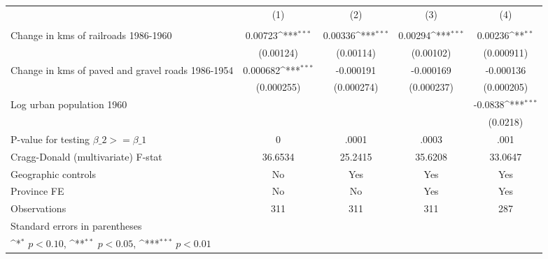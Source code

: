 {
\def\sym#1{\ifmmode^{#1}\else\(^{#1}\)\fi}
\begin{tabular}{l*{4}{c}}
\hline\hline
                &\multicolumn{1}{c}{(1)}&\multicolumn{1}{c}{(2)}&\multicolumn{1}{c}{(3)}&\multicolumn{1}{c}{(4)}\\
                &\multicolumn{1}{c}{}&\multicolumn{1}{c}{}&\multicolumn{1}{c}{}&\multicolumn{1}{c}{}\\
\hline
Change in kms of railroads 1986-1960&  0.00723\sym{***}&  0.00336\sym{***}&  0.00294\sym{***}&  0.00236\sym{**} \\
                &(0.00124)         &(0.00114)         &(0.00102)         &(0.000911)         \\
[1em]
Change in kms of paved and gravel roads 1986-1954& 0.000682\sym{***}&-0.000191         &-0.000169         &-0.000136         \\
                &(0.000255)         &(0.000274)         &(0.000237)         &(0.000205)         \\
[1em]
Log urban population 1960&                  &                  &                  &  -0.0838\sym{***}\\
                &                  &                  &                  & (0.0218)         \\
\hline
P-value for testing $\beta\_{2} >= \beta\_{1}$&        0         &    .0001         &    .0003         &     .001         \\
Cragg-Donald (multivariate) F-stat&  36.6534         &  25.2415         &  35.6208         &  33.0647         \\
Geographic controls&       No         &      Yes         &      Yes         &      Yes         \\
Province FE     &       No         &       No         &      Yes         &      Yes         \\
Observations    &      311         &      311         &      311         &      287         \\
\hline\hline
\multicolumn{5}{l}{\footnotesize Standard errors in parentheses}\\
\multicolumn{5}{l}{\footnotesize \sym{*} \(p<0.10\), \sym{**} \(p<0.05\), \sym{***} \(p<0.01\)}\\
\end{tabular}
}
